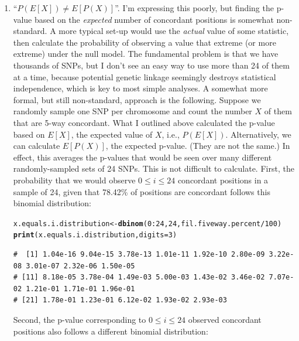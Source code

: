\documentclass{article}\usepackage[]{graphicx}\usepackage[]{color}
\makeatletter
\newcommand{\hlnum}[1]{\textcolor[rgb]{0.686,0.059,0.569}{#1}}%
\newcommand{\hlopt}[1]{\textcolor[rgb]{0,0,0}{#1}}%
\newcommand{\hlstd}[1]{\textcolor[rgb]{0.345,0.345,0.345}{#1}}%
\newcommand{\hlkwb}[1]{\textcolor[rgb]{0.69,0.353,0.396}{#1}}%
\newcommand{\hlkwc}[1]{\textcolor[rgb]{0.333,0.667,0.333}{#1}}%
\newcommand{\hlkwd}[1]{\textcolor[rgb]{0.737,0.353,0.396}{\textbf{#1}}}%
\newenvironment{kframe}{%
 \def\at@end@of@kframe{}%
 \ifinner\ifhmode%
  \def\at@end@of@kframe{\end{minipage}}%
  \begin{minipage}{\columnwidth}%
 \fi\fi%
 \def\FrameCommand##1{\hskip\@totalleftmargin \hskip-\fboxsep
 \colorbox{shadecolor}{##1}\hskip-\fboxsep
     \hskip-\linewidth \hskip-\@totalleftmargin \hskip\columnwidth}%
 \MakeFramed {\advance\hsize-\width
   \@totalleftmargin\z@ \linewidth\hsize
   \@setminipage}}%
 {\par\unskip\endMakeFramed%
 \at@end@of@kframe}
\newenvironment{knitrout}{}{} %
\makeatother
\begin{document}
\begin{enumerate}
  \item ``$P(E[X]) \neq E[P(X)]$''.  I'm expressing this poorly, but finding the p-value based on the \emph{expected} number of concordant positions is somewhat non-standard.  A more typical set-up would use the \emph{actual} value of some statistic, then calculate the probability of observing a value that extreme (or more extreme) under the null model.  The fundamental problem is that we have thousands of SNPs, but I don't see an easy way to use more than 24 of them at a time, because potential genetic linkage seemingly destroys statistical independence, which is key to most simple analyses.  
A somewhat more formal, but still non-standard, approach is the following.  Suppose we randomly sample one SNP per chromosome and count the number $X$ of them that are 5-way concordant.  What I outlined above calculated the p-value based on $E[X]$, the expected value of $X$, i.e., $P(E[X])$.  Alternatively, we can calculate $E[P(X)]$, the expected p-value.  (They are not the same.)  In effect, this averages the p-values that would be seen over many different randomly-sampled sets of 24 SNPs.  This is not difficult to calculate.  First, the probability that we would observe $0 \leq i \leq 24$ concordant positions in a sample of 24, given that 78.42\% of positions are concordant follows this binomial distribution:

\begin{knitrout}\footnotesize
{}\color{fgcolor}\begin{kframe}
\begin{alltt}
\hlstd{x.equals.i.distribution} \hlkwb{<-} \hlkwd{dbinom}\hlstd{(}\hlnum{0}\hlopt{:}\hlnum{24}\hlstd{,} \hlnum{24}\hlstd{, fil.fiveway.percent}\hlopt{/}\hlnum{100}\hlstd{)}
\hlkwd{print}\hlstd{(x.equals.i.distribution,} \hlkwc{digits}\hlstd{=}\hlnum{3}\hlstd{)}
\end{alltt}
\begin{verbatim}
#  [1] 1.04e-16 9.04e-15 3.78e-13 1.01e-11 1.92e-10 2.80e-09 3.22e-08 3.01e-07 2.32e-06 1.50e-05
# [11] 8.18e-05 3.78e-04 1.49e-03 5.00e-03 1.43e-02 3.46e-02 7.07e-02 1.21e-01 1.71e-01 1.96e-01
# [21] 1.78e-01 1.23e-01 6.12e-02 1.93e-02 2.93e-03
\end{verbatim}
\end{kframe}
\end{knitrout}

Second, the p-value corresponding to $0 \leq i \leq 24$ observed concordant positions also follows a different binomial distribution:


\end{enumerate}
\end{document}
